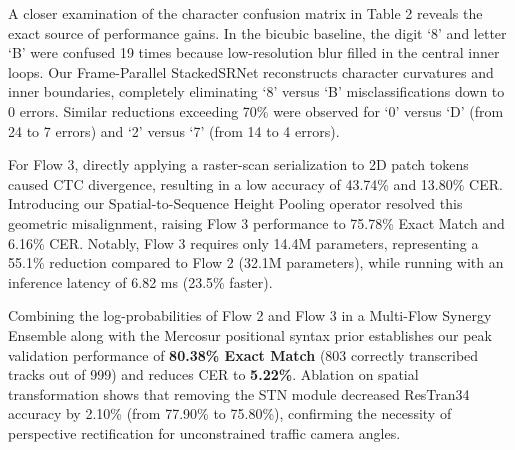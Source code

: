 \documentclass[sigconf]{acmart}
\begin{document}
\begin{table}[t]
\centering
\small
\caption{Confusion Matrix Analysis on Highly Confusable Alphanumeric Pairs (Measured on 999 Scenario-B Validation Tracks).}
\label{tab:hard_pairs}
\end{table}

A closer examination of the character confusion matrix in Table 2 reveals the exact source of performance gains. In the bicubic baseline, the digit `8' and letter `B' were confused 19 times because low-resolution blur filled in the central inner loops. Our Frame-Parallel StackedSRNet reconstructs character curvatures and inner boundaries, completely eliminating `8' versus `B' misclassifications down to 0 errors. Similar reductions exceeding 70\% were observed for `0' versus `D' (from 24 to 7 errors) and `2' versus `7' (from 14 to 4 errors).

For Flow 3, directly applying a raster-scan serialization to 2D patch tokens caused CTC divergence, resulting in a low accuracy of 43.74\% and 13.80\% CER. Introducing our Spatial-to-Sequence Height Pooling operator resolved this geometric misalignment, raising Flow 3 performance to 75.78\% Exact Match and 6.16\% CER. Notably, Flow 3 requires only 14.4M parameters, representing a 55.1\% reduction compared to Flow 2 (32.1M parameters), while running with an inference latency of 6.82 ms (23.5\% faster).

Combining the log-probabilities of Flow 2 and Flow 3 in a Multi-Flow Synergy Ensemble along with the Mercosur positional syntax prior establishes our peak validation performance of \textbf{80.38\% Exact Match} (803 correctly transcribed tracks out of 999) and reduces CER to \textbf{5.22\%}. Ablation on spatial transformation shows that removing the STN module decreased ResTran34 accuracy by 2.10\% (from 77.90\% to 75.80\%), confirming the necessity of perspective rectification for unconstrained traffic camera angles.
\end{document}
